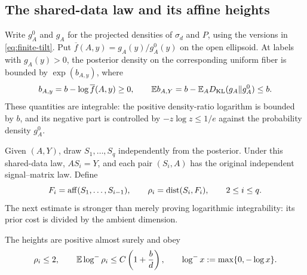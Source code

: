 \subsection{The shared-data law and its affine heights}

Write $g_A^0$ and $g_A$ for the projected densities of $\sigma_d$ and $P$,
using the versions in \eqref{eq:finite-tilt}. Put
$\overline f(A,y)=g_A(y)/g_A^0(y)$ on the open ellipsoid. At labels with
$g_A(y)>0$, the posterior density on the corresponding uniform fiber is bounded by
$\exp(b_{A,y})$, where
\begin{equation}\label{eq:distance-posterior-budget}
 b_{A,y}=b-\log\overline f(A,y)\ge0,\qquad
 \mathbb E b_{A,Y}=b-\mathbb E_AD_{\mathrm{KL}}(g_A\Vert g_A^0)\le b.
\end{equation}
These quantities are integrable: the positive density-ratio logarithm is
bounded by $b$, and its negative part is controlled by
$-z\log z\le1/e$ against the probability density $g_A^0$.

Given $(A,Y)$, draw $S_1,\ldots,S_q$ independently from the posterior.
Under this shared-data law, $AS_i=Y$, and each pair $(S_i,A)$ has the
original independent signal--matrix law. Define
\[
 F_i=\operatorname{aff}(S_1,\ldots,S_{i-1}),\qquad
 \rho_i=\operatorname{dist}(S_i,F_i),\qquad 2\le i\le q.
\]
The next estimate is stronger than merely proving logarithmic
integrability: its prior cost is divided by the ambient dimension.

\begin{lemma}\label{lem:distance-heights}
The heights are positive almost surely and obey
\begin{equation}\label{eq:distance-height}
 \rho_i\le2,\qquad
 \mathbb E\log^-\rho_i\le C\left(1+\frac bd\right),
 \qquad \log^-x:=\max\{0,-\log x\}.
\end{equation}
\end{lemma}

